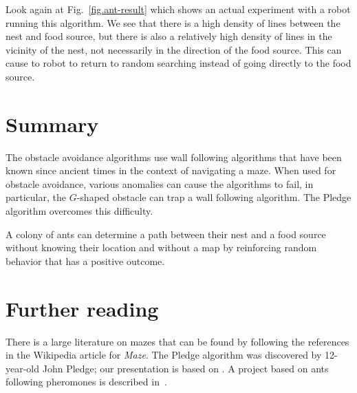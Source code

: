 \smallskip

Look again at Fig.~\ref{fig.ant-result} which shows an actual experiment with a robot running this algorithm. We see that there is a high density of lines between the nest and food source, but there is also a relatively high density of lines in the vicinity of the nest, not necessarily in the direction of the food source. This can cause to robot to return to random searching instead of going directly to the food source.

\section{Summary}

The obstacle avoidance algorithms use wall following algorithms that have been known since ancient times in the context of navigating a maze. When used for obstacle avoidance, various anomalies can cause the algorithms to fail, in particular, the $G$-shaped obstacle can trap a wall following algorithm. The Pledge algorithm overcomes this difficulty.

A colony of ants can determine a path between their nest and a food source without knowing their location and without a map by reinforcing random behavior that has a positive outcome.

\section{Further reading}

There is a large literature on mazes that can be found by following the references in the Wikipedia article for \emph{Maze}. The Pledge algorithm was discovered by 12-year-old John Pledge; our presentation is based on \cite[Chap.~4]{turtle}. A project based on ants following pheromones is described in~\cite{Mayet2010}.




